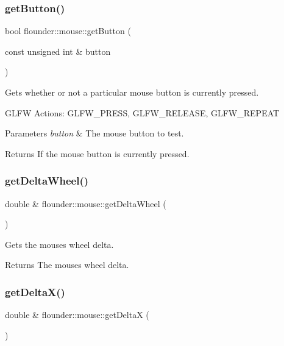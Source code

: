 \subsubsection{\texorpdfstring{get\+Button()}{getButton()}}
{\footnotesize\ttfamily bool flounder\+::mouse\+::get\+Button (\begin{DoxyParamCaption}\item[{const unsigned int \&}]{button }\end{DoxyParamCaption})}



Gets whether or not a particular mouse button is currently pressed. 

G\+L\+FW Actions\+: G\+L\+F\+W\+\_\+\+P\+R\+E\+SS, G\+L\+F\+W\+\_\+\+R\+E\+L\+E\+A\+SE, G\+L\+F\+W\+\_\+\+R\+E\+P\+E\+AT


\begin{DoxyParams}{Parameters}
{\em button} & The mouse button to test. \\
\hline
\end{DoxyParams}
\begin{DoxyReturn}{Returns}
If the mouse button is currently pressed. 
\end{DoxyReturn}
\mbox{\label{classflounder_1_1mouse_ac1d5941ff7835327c4a90e1259934cf2}} 
\subsubsection{\texorpdfstring{get\+Delta\+Wheel()}{getDeltaWheel()}}
{\footnotesize\ttfamily double \& flounder\+::mouse\+::get\+Delta\+Wheel (\begin{DoxyParamCaption}{ }\end{DoxyParamCaption})}



Gets the mouses wheel delta. 

\begin{DoxyReturn}{Returns}
The mouses wheel delta. 
\end{DoxyReturn}
\mbox{\label{classflounder_1_1mouse_a4c1a6fdbd6c23fc64bfbbd3deca4af44}} 
\subsubsection{\texorpdfstring{get\+Delta\+X()}{getDeltaX()}}
{\footnotesize\ttfamily double \& flounder\+::mouse\+::get\+DeltaX (\begin{DoxyParamCaption}{ }\end{DoxyParamCaption})}



